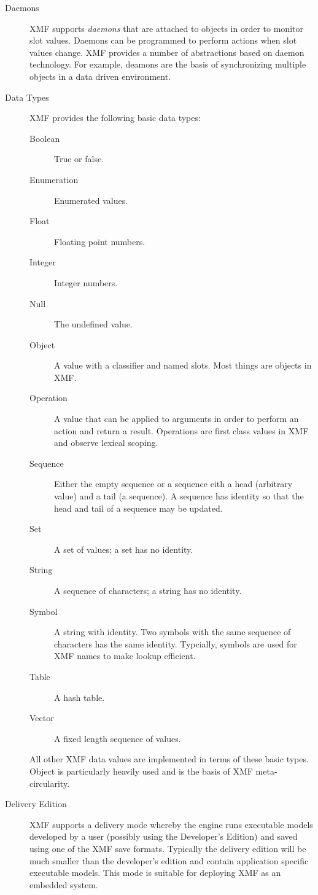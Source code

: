 \documentclass{article}
\begin{document}
\begin{description}
\item[Daemons]
XMF supports {\em daemons} that are attached to objects in order to monitor 
slot values. Daemons can be programmed to perform actions when slot values
change. XMF provides a number of abstractions based on daemon technology.
For example, deamons are the basis of synchronizing multiple objects in a
data driven environment.

\item[Data Types]
XMF provides the following basic data types:
\begin{description}
\item[Boolean] True or false.
\item[Enumeration] Enumerated values.
\item[Float] Floating point numbers.
\item[Integer] Integer numbers.
\item[Null] The undefined value.
\item[Object] A value with a classifier and named slots. Most things are objects in XMF.
\item[Operation] A value that can be applied to arguments in order to perform an action and
return a result. Operations are first class values in XMF and observe lexical scoping.
\item[Sequence] Either the empty sequence or a sequence eith a head (arbitrary value) and a tail 
(a sequence). A sequence has identity so that the head and tail of a sequence may be updated.
\item[Set] A set of values; a set has no identity.
\item[String] A sequence of characters; a string has no identity.
\item[Symbol] A string with identity. Two symbols with the same sequence of characters has the same identity. 
Typcially, symbols are used for XMF names to make lookup efficient.
\item[Table] A hash table.
\item[Vector] A fixed length sequence of values.
\end{description}
All other XMF data values are implemented in terms of these basic types. Object is particularly
heavily used and is the basis of XMF meta-circularity.

\item[Delivery Edition]
XMF supports a delivery mode whereby the engine runs executable models
developed by a user (possibly using the Developer's Edition) and saved
using one of the XMF save formats. Typically the delivery edition will be
much smaller than the developer's edition and contain application specific
executable models. This mode is suitable for deploying XMF as an embedded 
system.


\end{description}
\end{document}
